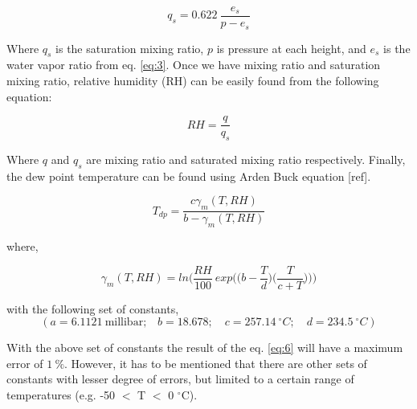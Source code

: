 \documentclass[a4paper,12pt]{article}
\numberwithin{equation}{section} %
\begin{document}
\vspace{0.25cm}
\begin{equation}\label{eq:4}
q_s = 0.622 \: \frac{e_s}{p - e_s}
\end{equation}
\vspace{0.25cm}

Where $q_s$ is the saturation mixing ratio, $p$ is pressure at each height, and $e_s$ is the water vapor ratio from eq. \ref{eq:3}. Once we have mixing ratio and saturation mixing ratio, relative humidity (RH) can be easily found from the following equation:

\vspace{0.25cm}
\begin{equation}\label{eq:5}
RH=\frac{q}{q_s}
\end{equation}
\vspace{0.25cm}

Where $q$ and $q_s$ are mixing ratio and saturated mixing ratio respectively. Finally, the dew point temperature can be found using Arden Buck equation [ref].

\vspace{0.25cm}
\begin{equation}\label{eq:6}
T_{dp} = \frac{c\gamma_m(T,RH)}{b - \gamma_m (T,RH)}
\end{equation}

where,

\begin{equation}
\gamma_m(T,RH) = ln\Bigg(\frac{RH}{100}\: exp\Big(\Big(b - \frac{T}{d}\Big)\Big(\frac{T}{c+T}\Big)\Big)\Bigg)
\end{equation}

\vspace{0.25cm}

with the following set of constants,
\begin{equation*}
(a = 6.1121\: \text{millibar;} \quad b = 18.678; \quad c = 257.14 \:^\circ C; \quad d = 234.5 \: ^\circ C)
\end{equation*}

\vspace{0.25cm}

With the above set of constants the result of the eq. \ref{eq:6} will have a maximum error of $1\: \%$. However, it has to be mentioned that there are other sets of constants with lesser degree of errors, but limited to a certain range of temperatures (e.g. -50 $<$ T $<$ 0 $^\circ$C). %
\end{document}
